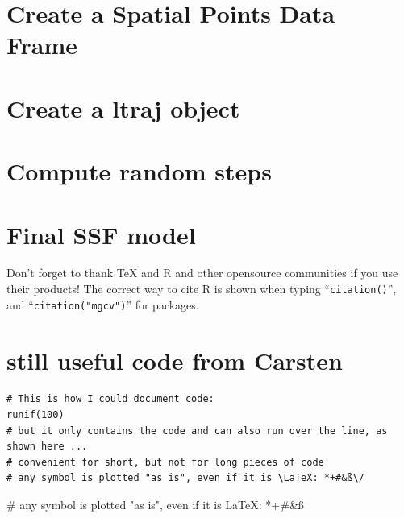 \documentclass[11pt, a4paper]{article}\usepackage[]{graphicx}\usepackage[]{color}
\begin{document}
\section{Create a Spatial Points Data Frame}%

\section{Create a ltraj object}%

\section{Compute random steps}

\section{Final SSF model}


Don't forget to thank TeX and R and other opensource communities if you use their products! The correct way to cite R is shown when typing ``\texttt{citation()}'', and ``\texttt{citation("mgcv")}'' for packages.

\newpage
\section{still useful code from Carsten}


\begin{verbatim}
# This is how I could document code:
runif(100)
# but it only contains the code and can also run over the line, as shown here ...
# convenient for short, but not for long pieces of code
# any symbol is plotted "as is", even if it is \LaTeX: *+#&ß\/
\end{verbatim}

# any symbol is plotted "as is", even if it is \LaTeX: *+#&ß\/
\end{document}
